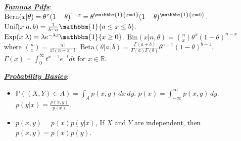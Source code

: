 \documentclass[10pt]{article}
\newcommand{\bulletPoint}[1]{\ul{\textit{\textbf{#1}}}}
\begin{document}
\singlespacing


\begin{multicols*}{2}

\scriptsize

\raggedright



\bulletPoint{Famous Pdfs}:\quad
$\text{Bern}(x | \theta) = \theta^x (1 - \theta)^{1-x}=\theta^{\mathbbm{1}\{x=1\}} (1 - \theta)^{\mathbbm{1}\{x=0\}}$.
$\text{Unif}(x | a, b) = \frac{1}{b-a}  \mathbbm{1}\{a \leq x \leq b\}$.\quad
$\text{Exp}(x | \lambda) = \lambda e^{-\lambda x} \mathbbm{1}\{x \geq 0\}$.
$\text{Bin}(x | n, \theta) = \binom{n}{x} \theta^x (1 - \theta)^{n-x}$
where $\binom{n}{x} = \frac{n!}{x!(n-x)!}$.
$\text{Beta}(\theta | a, b) = \frac{\Gamma(a+b)}{\Gamma(a) \Gamma(b)} \theta^{a-1} (1-\theta)^{b-1}$.
$\Gamma(x) = \int_0^\infty t^{x-1} e^{-t} dt$ for $x \in \mathbb{R}$.

\bulletPoint{Probability Basics}:
\begin{itemize}[label=$\cdot$,leftmargin=0pt]
\item$\mathbb{P}((X,Y) \in A) = \int_A p(x,y) \,dx\,dy$. \quad
$p(x) = \int_{-\infty}^{\infty} p(x,y) \,dy$.\quad
$p(y | x) = \frac{p(x,y)}{p(x)}$.
\item$p(x,y) = p(x)p(y | x)$, 
If \(X\) and \(Y\) are independent, then \( p(x,y) = p(x)p(y) \).


\end{itemize}
\end{multicols*}
\end{document}

